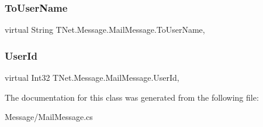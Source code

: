 \subsubsection{\texorpdfstring{To\+User\+Name}{ToUserName}}
{\footnotesize\ttfamily virtual String T\+Net.\+Message.\+Mail\+Message.\+To\+User\+Name\hspace{0.3cm}{\ttfamily [get]}, {\ttfamily [set]}}





\mbox{\label{class_t_net_1_1_message_1_1_mail_message_aff952688f606e0f492e21965d05f73e8}} 
\subsubsection{\texorpdfstring{User\+Id}{UserId}}
{\footnotesize\ttfamily virtual Int32 T\+Net.\+Message.\+Mail\+Message.\+User\+Id\hspace{0.3cm}{\ttfamily [get]}, {\ttfamily [set]}}







The documentation for this class was generated from the following file\+:\begin{DoxyCompactItemize}
\item 
Message/Mail\+Message.\+cs\end{DoxyCompactItemize}
